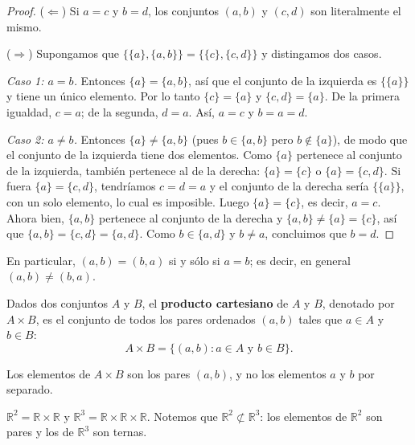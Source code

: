 \documentclass[12pt,a4paper]{book}
\begin{document}
  \begin{proof}
    ($\Leftarrow$) Si $a=c$ y $b=d$, los conjuntos $(a,b)$ y $(c,d)$ son literalmente el mismo.

    ($\Rightarrow$) Supongamos que $\big\{\{a\},\{a,b\}\big\}=\big\{\{c\},\{c,d\}\big\}$ y distingamos dos casos.

    \textit{Caso 1: $a=b$.} Entonces $\{a\}=\{a,b\}$, así que el conjunto de la izquierda es $\{\{a\}\}$ y tiene un único elemento. Por lo tanto $\{c\}=\{a\}$ y $\{c,d\}=\{a\}$. De la primera igualdad, $c=a$; de la segunda, $d=a$. Así, $a=c$ y $b=a=d$.

    \textit{Caso 2: $a\neq b$.} Entonces $\{a\}\neq\{a,b\}$ (pues $b\in\{a,b\}$ pero $b\notin\{a\}$), de modo que el conjunto de la izquierda tiene dos elementos. Como $\{a\}$ pertenece al conjunto de la izquierda, también pertenece al de la derecha: $\{a\}=\{c\}$ o $\{a\}=\{c,d\}$. Si fuera $\{a\}=\{c,d\}$, tendríamos $c=d=a$ y el conjunto de la derecha sería $\{\{a\}\}$, con un solo elemento, lo cual es imposible. Luego $\{a\}=\{c\}$, es decir, $a=c$. Ahora bien, $\{a,b\}$ pertenece al conjunto de la derecha y $\{a,b\}\neq\{a\}=\{c\}$, así que $\{a,b\}=\{c,d\}=\{a,d\}$. Como $b\in\{a,d\}$ y $b\neq a$, concluimos que $b=d$.
  \end{proof}

  En particular, $(a,b)=(b,a)$ si y sólo si $a=b$; es decir, en general $(a,b)\neq(b,a)$.

  \begin{definicion}
    Dados dos conjuntos $A$ y $B$, el \textbf{producto cartesiano} de $A$ y $B$, denotado por $A\times B$, es el conjunto de todos los pares ordenados $(a,b)$ tales que $a\in A$ y $b\in B$:
    \begin{equation*}
      A\times B=\{(a,b) : a\in A \text{ y } b\in B\}.
    \end{equation*}
  \end{definicion}

  Los elementos de $A\times B$ son los pares $(a,b)$, y no los elementos $a$ y $b$ por separado.

  \begin{ejemplo}
    $\mathbb{R}^2=\mathbb{R}\times\mathbb{R}$ y $\mathbb{R}^3=\mathbb{R}\times\mathbb{R}\times\mathbb{R}$. Notemos que $\mathbb{R}^2\not\subset\mathbb{R}^3$: los elementos de $\mathbb{R}^2$ son pares y los de $\mathbb{R}^3$ son ternas.
  \end{ejemplo}

\end{document}
